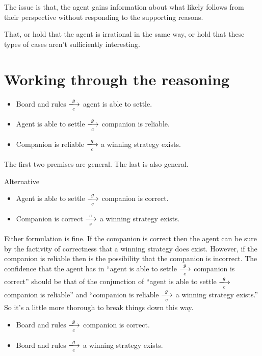 \documentclass[10pt]{article}
\begin{document}
The issue is that, the agent gains information about what likely follows from their perspective without responding to the supporting reasons.

That, or hold that the agent is irrational in the same way, or hold that these types of cases aren't sufficiently interesting.

\newpage




\newpage

\section{Working through the reasoning}
\label{sec:work-thro-reas}

\begin{itemize}
\item Board and rules \(\xlongrightarrow[c]{g}\) agent is able to settle.
\item Agent is able to settle \(\xlongrightarrow[c]{g}\) companion is reliable.
\item Companion is reliable \(\xlongrightarrow[c]{g}\) a winning strategy exists.
\end{itemize}

The first two premises are general.
The last is also general.

Alternative

\begin{itemize}
\item Agent is able to settle \(\xlongrightarrow[c]{g}\) companion is correct.
\item Companion is correct \(\xlongrightarrow[s]{c}\) a winning strategy exists.
\end{itemize}
Either formulation is fine.
If the companion is correct then the agent can be sure by the factivity of correctness that a winning strategy does exist.
However, if the companion is reliable then is the possibility that the companion is incorrect.
The confidence that the agent has in ``agent is able to settle \(\xlongrightarrow[c]{g}\) companion is correct'' should be that of the conjunction of ``agent is able to settle \(\xlongrightarrow[c]{g}\) companion is reliable'' and ``companion is reliable \(\xlongrightarrow[c]{g}\) a winning strategy exists.''
So it's a little more thorough to break things down this way.

\begin{itemize}
\item Board and rules \(\xlongrightarrow[c]{g}\) companion is correct.
\item Board and rules \(\xlongrightarrow[c]{g}\) a winning strategy exists.
\end{itemize}
\end{document}
